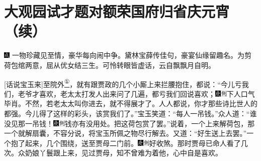 

\chapter{大观园试才题对额\hspace{.5em}荣国府归省庆元宵（续）}
{\includegraphics[width=3mm]{../Images/00005}  \kaishu 一物珍藏见至情，豪华每向闹中争。黛林宝薛传佳句，豪宴仙缘留趣名。为剪荷包绾两意，屈从优女结三生。可怜转眼皆虚话，云自飘飘月自明。}

{[}话说宝玉来{]}至院外\href{../Text/part0022_split_000.html\#lnkback_1_a}{\textsuperscript{①}}，就有跟贾政的几个小厮上来拦腰抱住，都说：``今儿亏我们，老爷才喜欢，老太太打发人出来问了几遍，都亏我们回说喜欢；{\includegraphics[width=3mm]{../Images/00004}\includegraphics[width=3mm]{../Images/00011}\footnotesize \kaishu 下人口气毕肖。}不然，若老太太叫你进去，就不得展才了。人人都说，你才那些诗比世人的都强。今儿得了这样的彩头，该赏我们了。''宝玉笑道：``每人一吊钱。''众人道：``谁没见那一吊钱！{\includegraphics[width=3mm]{../Images/00004}\includegraphics[width=3mm]{../Images/00011}\footnotesize \kaishu 钱亦有没用处。}把这荷包赏了罢。''说着，一个上来解荷包，那一个就解扇囊，不容分说，将宝玉所佩之物尽行解去。又道：``好生送上去罢。''一个抱了起来，几个围绕，送至贾母二门前。{\includegraphics[width=3mm]{../Images/00004}\includegraphics[width=3mm]{../Images/00011}\footnotesize \kaishu 好收煞。}那时贾母已命人看了几次。众奶娘丫鬟跟上来，见过贾母，知不曾难为着他，心中自是喜欢。

